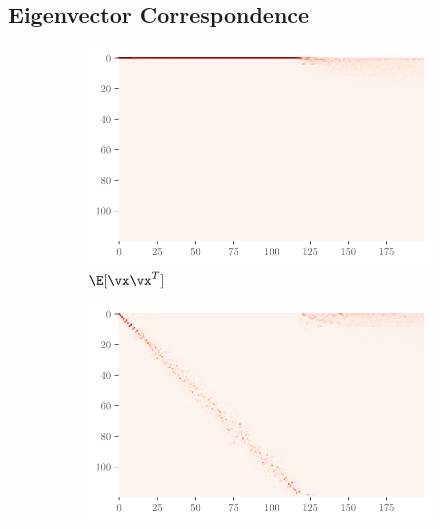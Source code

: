 \subsection{Eigenvector Correspondence}
\label{sec:eigen_corr}
\begin{figure}[ht]
    \centering
    \begin{subfigure}[t]{0.46\textwidth}
        \centering
        \captionsetup{justification=centering}
        \includegraphics[width=\textwidth]{Figures/Correspondence/LeNet5_fixlr0.01/xxT_Trueest_real_corr_expand_t200_CIFAR10_Exp1_LeNet5_fixlr0.01R2_E-1_fc1.pdf}
        \caption{$\E[\vx\vx^T]$}
        \label{fig:Corr_xxT_True_fc}
    \end{subfigure}
    \begin{subfigure}[t]{0.46\textwidth}
        \centering
        \captionsetup{justification=centering}
        \includegraphics[width=\textwidth]{Figures/Correspondence/LeNet5_fixlr0.01/UTAU_Trueest_real_corr_expand_t200_CIFAR10_Exp1_LeNet5_fixlr0.01R2_E-1_fc1.pdf}

\end{subfigure}
\end{figure}
